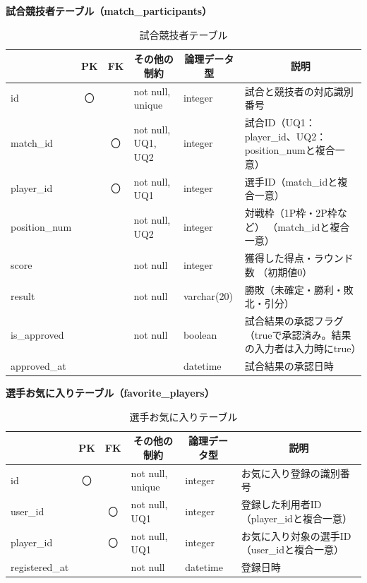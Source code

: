 \noindent\textbf{試合競技者テーブル（match\_participants）}
\begin{table}[H]
    \centering
    \caption{試合競技者テーブル}
    \label{tab:match_participants_table}
    \begin{tabularx}{\linewidth}{|l|c|c|l|l|X|}
        \hline
        \rowcolor{tableblue}
        \multicolumn{1}{|c|}{カラム名} & \multicolumn{1}{c|}{PK} & \multicolumn{1}{c|}{FK} & \multicolumn{1}{c|}{その他の制約} & \multicolumn{1}{c|}{論理データ型} & \multicolumn{1}{c|}{説明} \\ \hline
        id & 〇 & & not null, unique & integer & 試合と競技者の対応識別番号 \\ \hline
        match\_id & & 〇 & not null, UQ1, UQ2 & integer & 試合ID（UQ1：player\_id、\newline UQ2：position\_numと複合一意） \\ \hline
        player\_id & & 〇 & not null, UQ1 & integer & 選手ID（match\_idと複合一意） \\ \hline
        position\_num & & & not null, UQ2 & integer & 対戦枠（1P枠・2P枠など） \newline（match\_idと複合一意） \\ \hline
        score & & & not null & integer & 獲得した得点・ラウンド数 \newline（初期値0） \\ \hline
        result & & & not null & varchar(20) & 勝敗（未確定・勝利・敗北・引分） \\ \hline
        is\_approved & & & not null & boolean & 試合結果の承認フラグ \newline（trueで承認済み。結果の入力者は入力時にtrue） \\ \hline
        approved\_at & & & & datetime & 試合結果の承認日時 \\ \hline
    \end{tabularx}
\end{table}

\noindent\textbf{選手お気に入りテーブル（favorite\_players）}
\begin{table}[H]
    \centering
    \caption{選手お気に入りテーブル}
    \label{tab:favorite_players_table}
    \begin{tabularx}{\linewidth}{|l|c|c|l|l|X|}
        \hline
        \rowcolor{tableblue}
        \multicolumn{1}{|c|}{カラム名} & \multicolumn{1}{c|}{PK} & \multicolumn{1}{c|}{FK} & \multicolumn{1}{c|}{その他の制約} & \multicolumn{1}{c|}{論理データ型} & \multicolumn{1}{c|}{説明} \\ \hline
        id & 〇 & & not null, unique & integer & お気に入り登録の識別番号 \\ \hline
        user\_id & & 〇 & not null, UQ1 & integer & 登録した利用者ID \newline（player\_idと複合一意） \\ \hline
        player\_id & & 〇 & not null, UQ1 & integer & お気に入り対象の選手ID \newline（user\_idと複合一意） \\ \hline
        registered\_at & & & not null & datetime & 登録日時 \\ \hline
    \end{tabularx}
\end{table}

